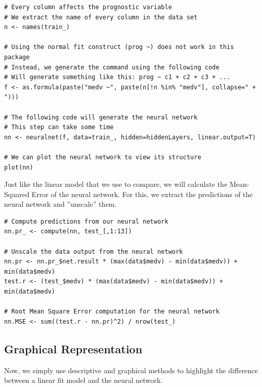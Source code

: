 \begin{lstlisting}
# Every column affects the prognostic variable
# We extract the name of every column in the data set
n <- names(train_)

# Using the normal fit construct (prog ~) does not work in this package
# Instead, we generate the command using the following code
# Will generate something like this: prog ~ c1 + c2 + c3 + ...
f <- as.formula(paste("medv ~", paste(n[!n %in% "medv"], collapse=" + ")))

# The following code will generate the neural network
# This step can take some time
nn <- neuralnet(f, data=train_, hidden=hiddenLayers, linear.output=T)

# We can plot the neural network to view its structure
plot(nn)
\end{lstlisting}

Just like the linear model that we use to compare, we will calculate the Mean-Squared Error of the neural network.
For this, we extract the predictions of the neural network and ''unscale'' them. 

\begin{lstlisting}
# Compute predictions from our neural network
nn.pr_ <- compute(nn, test_[,1:13])

# Unscale the data output from the neural network
nn.pr <- nn.pr_$net.result * (max(data$medv) - min(data$medv)) + min(data$medv)
test.r <- (test_$medv) * (max(data$medv) - min(data$medv)) + min(data$medv)

# Root Mean Square Error computation for the neural network
nn.MSE <- sum((test.r - nn.pr)^2) / nrow(test_)
\end{lstlisting}

\subsection{Graphical Representation}

Now, we simply use descriptive and graphical methods to highlight the difference between a linear fit model and the neural network.

